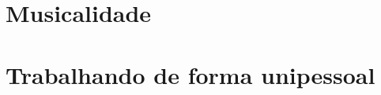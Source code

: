 \documentclass[12pt]{extbook} %
\begin{document}
\part{Musicalidade}




\part{Trabalhando de forma unipessoal}





%


\end{document}
